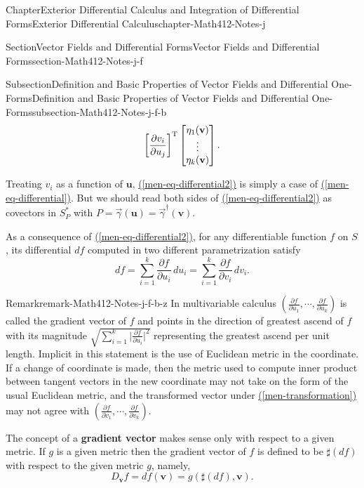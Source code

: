 \documentclass[oneside,10pt,]{book}
\newcommand{\xreffont}{\relax}
\newcommand{\terminology}[1]{\textbf{#1}}
\numberwithin{equation}{section}
\newcommand{\bu}{\mathbf{u}}
\newcommand{\bv}{\mathbf{v}}
\newcommand{\vg}{{\vec{\gamma}}}
\begin{document}
\begin{chapterptx}{Chapter}{Exterior Differential Calculus and Integration of Differential Forms}{}{Exterior Differential Calculus}{}{}{chapter-Math412-Notes-j}
\begin{sectionptx}{Section}{Vector Fields and Differential Forms}{}{Vector Fields and Differential Forms}{}{}{section-Math412-Notes-j-f}
\begin{subsectionptx}{Subsection}{Definition and Basic Properties of Vector Fields and Differential One-Forms}{}{Definition and Basic Properties of Vector Fields and Differential One-Forms}{}{}{subsection-Math412-Notes-j-f-b}
\begin{equation*}
\left[\frac{\partial v_{i}}{\partial u_{j}}\right]^{\rm T} \begin{bmatrix} \eta_{1}(\bv)\\ \vdots \\ \eta_{k}(\bv)\end{bmatrix}\text{.}
\end{equation*}
%
\par
Treating \(v_{i}\) as a function of \(\bu\), \hyperref[men-eq-differential2]{({\xreffont\ref{men-eq-differential2}})} is simply a case of \hyperref[men-eq-differential]{({\xreffont\ref{men-eq-differential}})}. But we should read both sides of \hyperref[men-eq-differential2]{({\xreffont\ref{men-eq-differential2}})} as covectors in \(S^{*}_{P}\) with \(P=\vg(\bu)=\vg^{{\dagger}}(\bv)\).%
\par
As a consequence of \hyperref[men-eq-differential2]{({\xreffont\ref{men-eq-differential2}})}, for any differentiable function \(f\) on \(S\), its differential \(df\) computed in two different parametrization satisfy%
\begin{equation*}
df=\sum_{i=1}^{k}\frac{\partial f}{\partial u_{i}}\, du_{i}= \sum_{i=1}^{k}\frac{\partial f}{\partial v_{i}}\, dv_{i}.
\end{equation*}
%
\begin{remark}{Remark}{}{remark-Math412-Notes-j-f-b-z}%
In multivariable calculus \((\frac{\partial f}{\partial u_{1}}, \cdots, \frac{\partial f}{\partial u_{k}})\) is called the gradient vector of \(f\) and points in the direction of greatest ascend of \(f\) with its magnitude \(\sqrt{\sum_{i=1}^{k}\vert \frac{\partial f}{\partial u_{i}}\vert^{2}}\) representing the greatest ascend per unit length. Implicit in this statement is the use of Euclidean metric in the coordinate. If a change of coordinate is made, then the metric used to compute inner product between tangent vectors in the new coordinate may not take on the form of the usual Euclidean metric, and the transformed vector under \hyperref[men-transformation]{({\xreffont\ref{men-transformation}})} may not agree with \((\frac{\partial f}{\partial v_{1}}, \cdots, \frac{\partial f}{\partial v_{k}})\).%
\par
The concept of a \terminology{gradient  vector} makes sense only with respect to a given metric. If \(g\) is a given metric then the gradient vector of \(f\) is defined to be \(\sharp(df)\) with respect to the given metric \(g\), namely,%
\begin{equation*}
D_{\bv}f=df(\bv)=g(\sharp(df), \bv).
\end{equation*}

\end{remark}
\end{subsectionptx}
\end{sectionptx}
\end{chapterptx}
\end{document}
